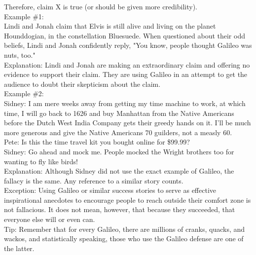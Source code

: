 \documentclass[a4paper,12pt,single,pdftex]{scrartcl}
\begin{document}
    
      Therefore, claim X is true (or should be given more credibility).
    \\

    
      Example \#1:
    \\

    
      Lindi and Jonah claim that Elvis is still alive and living on the planet Hounddogian, in the constellation Bluesuede. When questioned about their odd beliefs, Lindi and Jonah confidently reply, "You know, people thought Galileo was nuts, too."
    \\

    
      Explanation: Lindi and Jonah are making an extraordinary claim and offering no evidence to support their claim. They are using Galileo in an attempt to get the audience to doubt their skepticism about the claim.
    \\

    
      Example \#2:
    \\

    
      Sidney: I am mere weeks away from getting my time machine to work, at which time, I will go back to 1626 and buy Manhattan from the Native Americans before the Dutch West India Company gets their greedy hands on it. I'll be much more generous and give the Native Americans 70 guilders, not a measly 60.
    \\

    
      Pete: Is this the time travel kit you bought online for \$99.99?
    \\

    
      Sidney: Go ahead and mock me. People mocked the Wright brothers too for wanting to fly like birds!
    \\

    
      Explanation: Although Sidney did not use the exact example of Galileo, the fallacy is the same. Any reference to a similar story counts.
    \\

    
      Exception: Using Galileo or similar success stories to serve as effective inspirational anecdotes to encourage people to reach outside their comfort zone is not fallacious. It does not mean, however, that because they succeeded, that everyone else will or even can.
    \\

    
      Tip: Remember that for every Galileo, there are millions of cranks, quacks, and wackos, and statistically speaking, those who use the Galileo defense are one of the latter.
    \\
\end{document}
